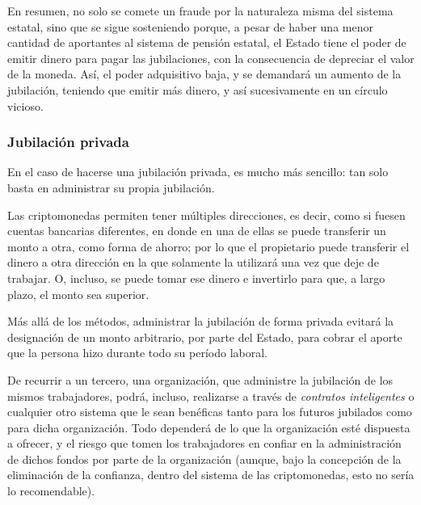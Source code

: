 \documentclass[12pt,a4paper,twoside]{book}
\begin{document}
En resumen, no solo se comete un fraude por la naturaleza misma del sistema estatal, sino que se sigue sosteniendo porque, a pesar de haber una menor cantidad de aportantes al sistema de pensión estatal, el Estado tiene el poder de emitir dinero para pagar las jubilaciones, con la consecuencia de depreciar el valor de la moneda. Así, el poder adquisitivo baja, y se demandará un aumento de la jubilación, teniendo que emitir más dinero, y así sucesivamente en un círculo vicioso.

\subsubsection{Jubilación privada}
En el caso de hacerse una jubilación privada, es mucho más sencillo: tan solo basta en administrar su propia jubilación.

Las criptomonedas permiten tener múltiples direcciones, es decir, como si fuesen cuentas bancarias diferentes, en donde en una de ellas se puede transferir un monto a otra, como forma de ahorro; por lo que el propietario puede transferir el dinero a otra dirección en la que solamente la utilizará una vez que deje de trabajar. O, incluso, se puede tomar ese dinero e invertirlo para que, a largo plazo, el monto sea superior.

Más allá de los métodos, administrar la jubilación de forma privada evitará la designación de un monto arbitrario, por parte del Estado, para cobrar el aporte que la persona hizo durante todo su período laboral.

De recurrir a un tercero, una organización, que administre la jubilación de los mismos trabajadores, podrá, incluso, realizarse a través de \textit{contratos inteligentes} o cualquier otro sistema que le sean benéficas tanto para los futuros jubilados como para dicha organización. Todo dependerá de lo que la organización esté dispuesta a ofrecer, y el riesgo que tomen los trabajadores en confiar en la administración de dichos fondos por parte de la organización (aunque, bajo la concepción de la eliminación de la confianza, dentro del sistema de las criptomonedas, esto no sería lo recomendable).
\end{document}
